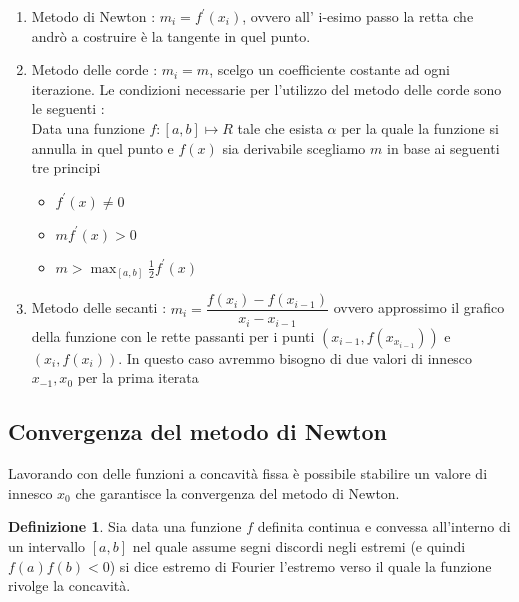 \documentclass[12pt, a4paper]{book}
\theoremstyle{definition}
\newtheorem{defn}{Definizione}[section]
\begin{document}
\begin{flushleft}
\begin{enumerate}
	\item Metodo di Newton : $m_{i} = f^{'}(x_{i})$,  ovvero all' i-esimo passo la retta che andrò a costruire è la tangente in quel punto. 
	\item Metodo delle corde : $m_{i} = m$,  scelgo un coefficiente costante ad ogni iterazione.  Le condizioni necessarie per l'utilizzo del metodo delle corde sono le seguenti : \\
	Data una funzione $f:[a,b] \mapsto R$ tale che esista $\alpha$ per la quale la funzione si annulla in quel punto e $f(x)$ sia derivabile scegliamo $m$ in base ai seguenti tre principi
	\begin{itemize}
		\item $f^{'}(x) \neq 0$
		\item $mf^{'}(x) > 0$
		\item $m > \max_{[a,b]} \frac{1}{2}f^{'}(x) $
	\end{itemize}
	\item Metodo delle secanti :  $m_{i} = \dfrac{f(x_{i}) - f(x_{i - 1})}{x_{i} - x_{i - 1}}$ ovvero approssimo il grafico della funzione con le rette passanti per i punti $(x_{i-1}, f(x_{x_{i-1}}))$ e $(x_{i}, f(x_{i}))$. In questo caso avremmo bisogno di due valori di innesco $x_{-1}, x_{0}$ per la prima iterata 
\end{enumerate}

\subsection{Convergenza del metodo di Newton}
Lavorando con delle funzioni a concavità fissa è possibile stabilire un valore di innesco $x_{0}$ che garantisce la convergenza del metodo di Newton.
\begin{defn}
Sia data una funzione $f$ definita continua e convessa all'interno di un intervallo $[a,b]$ nel quale assume segni discordi negli estremi (e quindi $f(a)f(b)<0$) si dice estremo di Fourier l'estremo verso il quale la funzione rivolge la concavità.
\end{defn}
\begin{figure}[h!]
    \centering
    \begin{minipage}{0.40\textwidth}
         \centering
\end{minipage}
\end{figure}
\end{flushleft}
\end{document}
